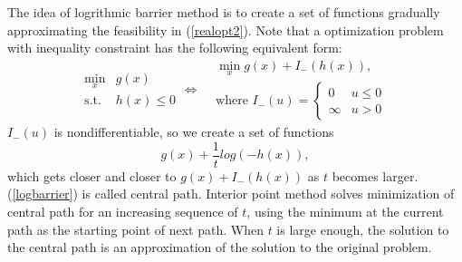 \documentclass[final,onefignum,onetabnum]{siamart190516}
\begin{document}
The idea of logrithmic barrier method\cite{boyd2004convex} is to create a set of functions gradually approximating the feasibility in (\ref{realopt2}). Note that a optimization problem with inequality constraint has the following equivalent form:
\begin{equation}
    \begin{aligned}
             \min_{x} &g(x)\\
             \text{s.t. } &h(x)\leq 0
    \end{aligned}
    \iff
    \begin{aligned}
         &\min_{x} g(x) + I_{-}(h(x)),\\
         &\text{where } I_{-}(u)= \begin{cases}0 & u \leq 0 \\ \infty & u>0\end{cases}
    \end{aligned}
\end{equation}
$I_{-}(u)$ is nondifferentiable, so we create a set of functions
\begin{equation}\label{logbarrier}
    g(x) + \frac{1}{t}log(-h(x)),
\end{equation}
which gets closer and closer to $g(x) + I_{-}(h(x))$ as $t$ becomes larger. (\ref{logbarrier}) is called central path. Interior point method solves minimization of central path for an increasing sequence of $t$, using the minimum at the current path as the starting point of next path. When $t$ is large enough, the solution to the central path is an approximation of the solution to the original problem.
\end{document}
